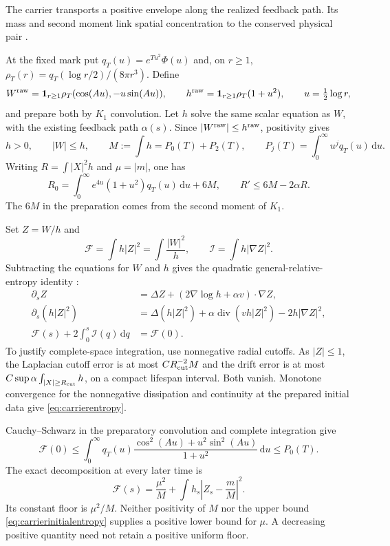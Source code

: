 \documentclass[11pt]{article}
\numberwithin{equation}{section}
\newcommand{\dd}{\,\mathrm d}
\begin{document}
The carrier transports a positive envelope along the realized
feedback path. Its mass and second moment link spatial concentration
to the conserved physical pair \cite{CarrierNote}.

At the fixed mark put $q_T(u)=e^{Tu^2}\Phi(u)$ and, on $r\ge1$,
$\rho_T(r)=q_T(\log r/2)/(8\pi r^3)$. Define
\[
 W^{\rm raw}=\mathbf1_{r\ge1}\rho_T
             (\cos(Au),-u\sin(Au)),\qquad
 h^{\rm raw}=\mathbf1_{r\ge1}\rho_T(1+u^2),\qquad u=\tfrac12\log r,
\]
and prepare both by $K_1$ convolution. Let $h$ solve the same scalar
equation as $W$, with the existing feedback path $\alpha(s)$.
Since $|W^{\rm raw}|\le h^{\rm raw}$, positivity gives
\begin{equation}\label{eq:carrierdomination}
 h>0,\qquad |W|\le h,\qquad
 M:=\int h=P_0(T)+P_2(T),\qquad
 P_j(T)=\int_0^\infty u^jq_T(u)\dd u.
\end{equation}
Writing $R=\int|X|^2h$ and $\mu=|m|$, one has
\begin{equation}\label{eq:carriermoment}
 R_0=\int_0^\infty e^{4u}(1+u^2)q_T(u)\dd u+6M,
 \qquad R'\le6M-2\alpha R.
\end{equation}
The $6M$ in the preparation comes from the second moment of $K_1$.

Set $Z=W/h$ and
\[
 \mathcal F=\int h|Z|^2=\int\frac{|W|^2}{h},\qquad
 \mathcal I=\int h|\nabla Z|^2.
\]
Subtracting the equations for $W$ and $h$ gives the quadratic
general-relative-entropy identity \cite[Lemma 1.1]{MichelMischlerPerthame}:
\begin{align}
 \partial_sZ&=\Delta Z+(2\nabla\log h+\alpha v)\cdot\nabla Z,\nonumber\\
 \partial_s(h|Z|^2)&=\Delta(h|Z|^2)
      +\alpha\operatorname{div}(vh|Z|^2)-2h|\nabla Z|^2,\nonumber\\
 \mathcal F(s)+2\int_0^s\mathcal I(q)\dd q&=\mathcal F(0).
 \label{eq:carrierentropy}
\end{align}
To justify complete-space integration, use nonnegative radial cutoffs.
As $|Z|\le1$, the Laplacian cutoff error is at most
$CR_{\rm cut}^{-2}M$ and the drift error is at most
$C\sup\alpha\int_{|X|\ge R_{\rm cut}}h$, on a compact lifespan
interval. Both vanish. Monotone convergence for the nonnegative
dissipation and continuity at the prepared initial data give
\eqref{eq:carrierentropy}.

Cauchy--Schwarz in the preparatory convolution and complete integration
give
\begin{equation}\label{eq:carrierinitialentropy}
 \mathcal F(0)\le\int_0^\infty q_T(u)
       \frac{\cos^2(Au)+u^2\sin^2(Au)}{1+u^2}\dd u\le P_0(T).
\end{equation}
The exact decomposition at every later time is
\begin{equation}\label{eq:carrierdecomposition}
 \mathcal F(s)=\frac{\mu^2}{M}
       +\int h_s\left|Z_s-\frac mM\right|^2.
\end{equation}
Its constant floor is $\mu^2/M$. Neither positivity of $M$ nor the
upper bound \eqref{eq:carrierinitialentropy} supplies a positive
lower bound for $\mu$. A decreasing positive quantity need not retain
a positive uniform floor.
\end{document}
